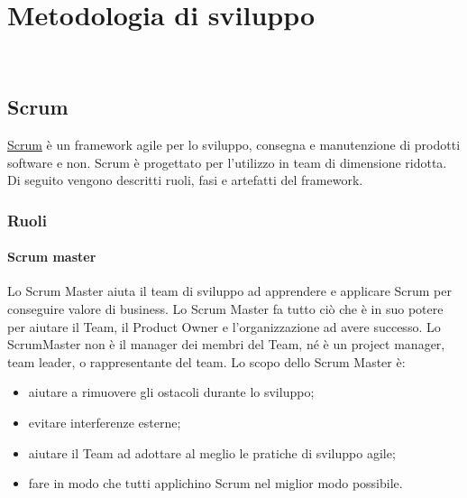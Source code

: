 
\chapter{Metodologia di sviluppo}
\label{cap:metodologia-lavoro}

\\

\section{Scrum}
\href{https://www.scrum.org/about}{Scrum} è un framework agile per lo sviluppo, consegna e manutenzione di prodotti software e non.
Scrum è progettato per l'utilizzo in team di dimensione ridotta. 
Di seguito vengono descritti ruoli, fasi e artefatti del framework.

\subsection{Ruoli}

\subsubsection{Scrum master}
Lo Scrum Master aiuta il team di sviluppo ad apprendere e applicare Scrum per conseguire valore di business. Lo Scrum Master fa tutto ciò che è in suo potere per aiutare il Team, il Product Owner e l'organizzazione ad avere successo. Lo ScrumMaster non è il manager dei membri del Team, né è un project manager, team leader, o rappresentante del team.
Lo scopo dello Scrum Master è:
\begin{itemize}
    \item aiutare a rimuovere gli ostacoli durante lo sviluppo;
    \item evitare interferenze esterne;
    \item aiutare il Team ad adottare al meglio le pratiche di sviluppo agile;
    \item fare in modo che tutti applichino Scrum nel miglior modo possibile.
\end{itemize}

